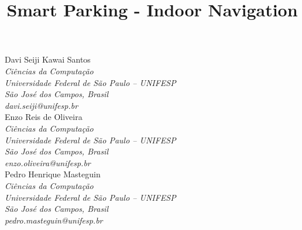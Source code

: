 \documentclass[11pt]{article}
\title{\vspace{-3cm}\textbf{Smart Parking - Indoor Navigation}}
\author{}
\date{}
\begin{document}
\maketitle

\vspace{-2cm}
\begin{multicols}{3}
    \centering
    Davi Seiji Kawai Santos\\
    \textit{Ciências da Computação}\\
    \textit{Universidade Federal de São Paulo -- UNIFESP}\\
    \textit{São José dos Campos, Brasil}\\
    \textit{davi.seiji@unifesp.br}\\[1cm]

    Enzo Reis de Oliveira\\
    \textit{Ciências da Computação}\\
    \textit{Universidade Federal de São Paulo -- UNIFESP}\\
    \textit{São José dos Campos, Brasil}\\
    \textit{enzo.oliveira@unifesp.br}\\[1cm]

    Pedro Henrique Masteguin\\
    \textit{Ciências da Computação}\\
    \textit{Universidade Federal de São Paulo -- UNIFESP}\\
    \textit{São José dos Campos, Brasil}\\
    \textit{pedro.masteguin@unifesp.br}\\[1cm]
\end{multicols}
\end{document}
